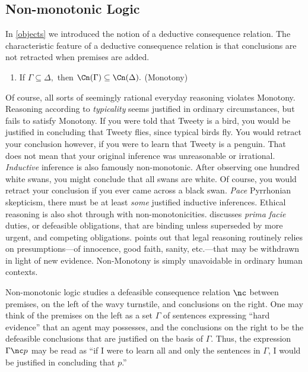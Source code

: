 \subsection{Non-monotonic Logic}
In \autoref{objects} we introduced the notion of a deductive consequence
relation. The characteristic feature of a deductive consequence relation is that
conclusions are not retracted when premises are added.
\begin{enumerate}
\item[] If $\Gamma\subseteq \Delta,$ then $\Cn(\Gamma) \subseteq \Cn(\Delta).$
\hfill (Monotony)
\end{enumerate}
Of course, all sorts of seemingly rational everyday reasoning violates Monotony.
Reasoning according to {\em typicality} seems justified in ordinary
circumstances, but fails to satisfy Monotony. If you were told that Tweety is a
bird, you would be justified in concluding that Tweety flies, since typical
birds fly. You would retract your conclusion however, if you were to learn that
Tweety is a penguin. That does not mean that your original inference was
unreasonable or irrational. {\em Inductive} inference is also famously
non-monotonic. After observing one hundred white swans, you might conclude that
all swans are white. Of course, you would retract your conclusion if you ever
came across a black swan. {\em Pace} Pyrrhonian skepticism, there must be at
least {\em some} justified inductive inferences.  Ethical reasoning is also shot
through with non-monotonicities. \citet{ross1930right} discusses {\em prima
facie} duties, or defeasible obligations, that are binding unless superseded by
more urgent, and competing obligations. \citet{ullman1983presumption} points out
that legal reasoning routinely relies on presumptions---of innocence, good
faith, sanity, etc.---that may be withdrawn in light of new evidence.
Non-Monotony is simply unavoidable in ordinary human contexts.  

Non-monotonic logic studies a defeasible consequence relation $\nc$ between
premises, on the left of the wavy turnstile, and conclusions on the right. One
may think of the premises on the left as a set $\Gamma$ of sentences expressing
``hard evidence'' that an agent may possesses, and the conclusions on the right
to be  the defeasible conclusions that are justified on the basis of $\Gamma$.
Thus, the expression $\Gamma \nc p$ may be read as ``if I were to learn all and
only the sentences in $\Gamma$, I would be justified in concluding that $p$.''

